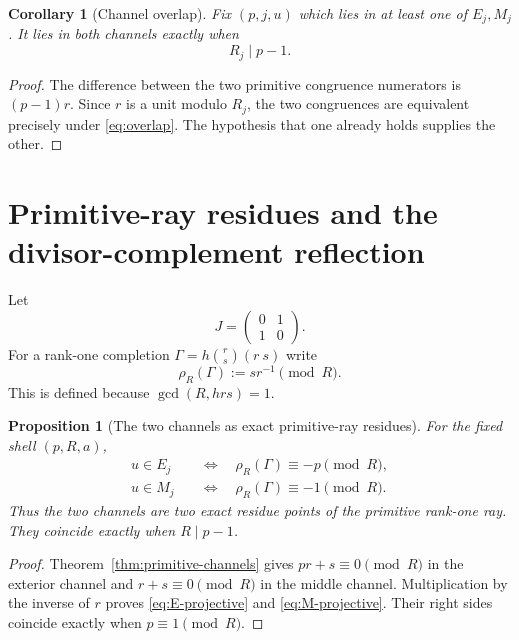\documentclass[11pt]{article}
\newtheorem{proposition}[theorem]{Proposition}
\newtheorem{corollary}[theorem]{Corollary}
\theoremstyle{definition}
\theoremstyle{remark}
\begin{document}
\begin{corollary}[Channel overlap]\label{cor:overlap}
Fix $(p,j,u)$ which lies in at least one of $E_j,M_j$.  It lies in both
channels exactly when
\begin{equation}\label{eq:overlap}
 R_j\mid p-1.
\end{equation}
\end{corollary}

\begin{proof}
The difference between the two primitive congruence numerators is
$(p-1)r$.  Since $r$ is a unit modulo $R_j$, the two congruences are
equivalent precisely under \eqref{eq:overlap}.  The hypothesis that one
already holds supplies the other.
\end{proof}


\section{Primitive-ray residues and the divisor-complement reflection}

Let
\begin{equation}\label{eq:swap-matrix}
 J=\begin{pmatrix}0&1\\1&0\end{pmatrix}.
\end{equation}
For a rank-one completion
\(
 \Gamma=h\binom r s(r\ s)
\)
write
\begin{equation}\label{eq:primitive-residue}
 \rho_{R}(\Gamma):=s r^{-1}\pmod R.
\end{equation}
This is defined because \(\gcd(R,hrs)=1\).

\begin{proposition}[The two channels as exact primitive-ray residues]
\label{prop:projective-rays}
For the fixed shell \((p,R,a)\),
\begin{align}
 u\in E_j
 &\quad\Longleftrightarrow\quad
 \rho_R(\Gamma)\equiv-p\pmod R,
 \label{eq:E-projective}\\
 u\in M_j
 &\quad\Longleftrightarrow\quad
 \rho_R(\Gamma)\equiv-1\pmod R.
 \label{eq:M-projective}
\end{align}
Thus the two channels are two exact residue points of the primitive rank-one
ray.  They coincide exactly when \(R\mid p-1\).
\end{proposition}

\begin{proof}
Theorem~\ref{thm:primitive-channels} gives
\(pr+s\equiv0\pmod R\) in the exterior channel and
\(r+s\equiv0\pmod R\) in the middle channel.  Multiplication by the inverse
of \(r\) proves \eqref{eq:E-projective} and \eqref{eq:M-projective}.  Their
right sides coincide exactly when \(p\equiv1\pmod R\).
\end{proof}
\end{document}
